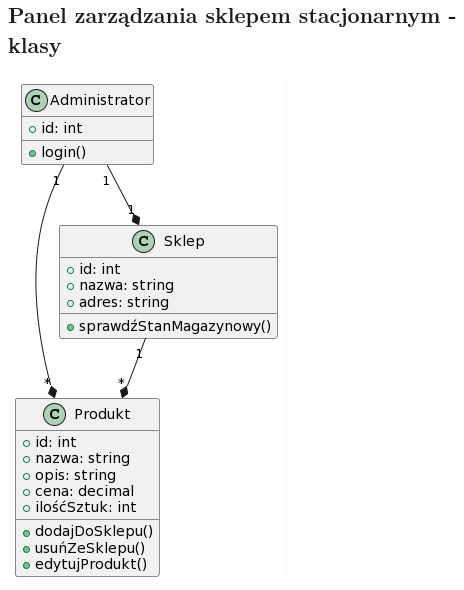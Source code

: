 \subsection{Panel zarządzania sklepem stacjonarnym - klasy}\label{subsec:panel-zarzadzania-sklepem-stacjonarnym-classes}

\includegraphics{diagrams/class/sklep_klasy}
